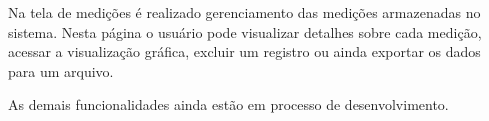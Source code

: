   Na tela de medições é realizado gerenciamento das medições armazenadas
  no sistema. Nesta página o usuário pode visualizar detalhes sobre cada medição,
  acessar a visualização gráfica, excluir um registro ou ainda exportar os dados para um arquivo.

  As demais funcionalidades ainda estão em processo de desenvolvimento.

  \newpage

